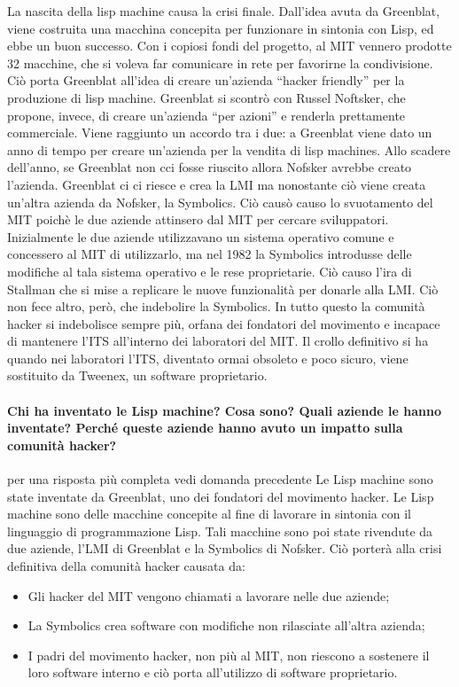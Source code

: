 \documentclass[a4paper]{article}
\begin{document}
		La nascita della lisp machine causa la crisi finale. Dall’idea avuta da Greenblat, viene costruita una macchina concepita per funzionare in sintonia con Lisp, ed ebbe un buon successo. Con i copiosi fondi del progetto, al MIT vennero prodotte 32 macchine, che si voleva far comunicare in rete per favorirne la condivisione. Ciò porta Greenblat all’idea di creare un’azienda “hacker friendly” per la produzione di lisp machine. Greenblat si scontrò con Russel Noftsker, che propone, invece, di creare un’azienda “per azioni” e renderla prettamente commerciale. Viene raggiunto un accordo tra i due: a Greenblat viene dato un anno di tempo per creare un’azienda per la vendita di lisp machines. Allo scadere dell'anno, se Greenblat non cci fosse riuscito allora Nofsker avrebbe creato l'azienda. Greenblat ci ci riesce e crea la LMI ma nonostante ciò viene creata un’altra azienda da Nofsker, la Symbolics. Ciò causò causo lo svuotamento del MIT poichè le due aziende attinsero dal MIT per cercare sviluppatori. Inizialmente le due aziende utilizzavano un sistema operativo comune e concessero al MIT di utilizzarlo, ma nel 1982 la Symbolics introdusse delle modifiche al tala sistema operativo e le rese proprietarie. Ciò causo l'ira di Stallman che si mise a replicare le nuove funzionalità per donarle alla LMI. Ciò non fece altro, però, che indebolire la Symbolics. In tutto questo la comunità hacker si indebolisce sempre più, orfana dei fondatori del movimento e incapace di mantenere l'ITS all'interno dei laboratori del MIT. Il crollo definitivo si ha quando nei laboratori l'ITS, diventato ormai obsoleto e poco sicuro, viene sostituito da Tweenex, un software proprietario.

		\paragraph{Chi ha inventato le Lisp machine? Cosa sono? Quali aziende le hanno inventate? Perché queste aziende hanno avuto un impatto sulla comunità hacker?}
		{per una risposta più completa vedi domanda precedente}
		Le Lisp machine sono state inventate da Greenblat, uno dei fondatori del movimento hacker. Le Lisp machine sono delle macchine concepite al fine di lavorare in sintonia con il linguaggio di programmazione Lisp. Tali macchine sono poi state rivendute da due aziende, l'LMI di Greenblat e la Symbolics di Nofsker. Ciò porterà alla crisi definitiva della comunità hacker causata da:
		\begin{itemize}
			\item Gli hacker del MIT vengono chiamati a lavorare nelle due aziende;
			\item La Symbolics crea software con modifiche non rilasciate all'altra azienda;
			\item I padri del movimento hacker, non più al MIT, non riescono a sostenere il loro software interno e ciò porta all'utilizzo di software proprietario.
		\end{itemize}
\end{document}
